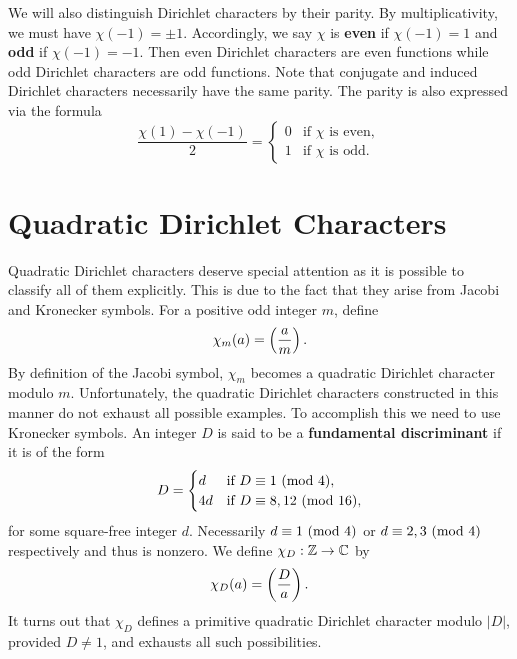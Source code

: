     We will also distinguish Dirichlet characters by their parity. By multiplicativity, we must have \(\chi(-1) = \pm 1\). Accordingly, we say \(\chi\) is \textbf{even} if \(\chi(-1) = 1\) and \textbf{odd} if \(\chi(-1) = -1\). Then even Dirichlet characters are even functions while odd Dirichlet characters are odd functions. Note that conjugate and induced Dirichlet characters necessarily have the same parity. The parity is also expressed via the formula
    \[
      \frac{\chi(1)-\chi(-1)}{2} = \begin{cases} 0 & \text{if \(\chi\) is even}, \\ 1 & \text{if \(\chi\) is odd}. \end{cases}
    \]
  \section{Quadratic Dirichlet Characters}
    Quadratic Dirichlet characters deserve special attention as it is possible to classify all of them explicitly. This is due to the fact that they arise from Jacobi and Kronecker symbols. For a positive odd integer \(m\), define
    \[
      \chi_{m}(a) = \left(\frac{a}{m}\right).
    \]
    By definition of the Jacobi symbol, \(\chi_{m}\) becomes a quadratic Dirichlet character modulo \(m\). Unfortunately, the quadratic Dirichlet characters constructed in this manner do not exhaust all possible examples. To accomplish this we need to use Kronecker symbols. An integer \(D\) is said to be a \textbf{fundamental discriminant} if it is of the form
    \[
      D = \begin{cases} d & \text{if \(D \equiv 1 \ (\mathrm{mod}\text{ }4)\)}, \\ 4d & \text{if \(D \equiv 8,12 \ (\mathrm{mod}\text{ }16)\)}, \end{cases}
    \]
    for some square-free integer \(d\). Necessarily \(d \equiv 1 \ (\mathrm{mod}\text{ }4)\) or \(d \equiv 2,3 \ (\mathrm{mod}\text{ }4)\) respectively and thus is nonzero. We define \(\chi_{D}:\mathbb{Z} \to \mathbb{C}\) by
    \[
      \chi_{D}(a) = \left(\frac{D}{a}\right).
    \]
    It turns out that \(\chi_{D}\) defines a primitive quadratic Dirichlet character modulo \(|D|\), provided \(D \neq 1\), and exhausts all such possibilities.

